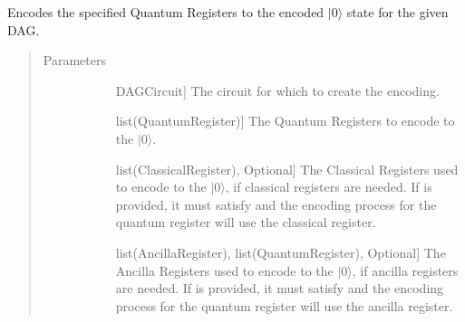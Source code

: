 \documentclass[letterpaper,10pt,english]{sphinxmanual}
\begin{document}
\begin{fulllineitems}
\begin{fulllineitems}
\end{fulllineitems}


\begin{fulllineitems}
\label{\detokenize{Steane:Steane.SteaneEncoder.getEncoderDag}}
\sphinxAtStartPar
Encodes the specified Quantum Registers to the encoded \(|0\rangle\) state for the given DAG.
\begin{quote}\begin{description}
\item[{Parameters}] \leavevmode\begin{description}
\item[{}] \leavevmode{[}DAGCircuit{]}
\sphinxAtStartPar
The circuit for which to create the encoding.

\item[{}] \leavevmode{[}list(QuantumRegister){]}
\sphinxAtStartPar
The Quantum Registers to encode to the \(|0\rangle\).

\item[{}] \leavevmode{[}list(ClassicalRegister), Optional{]}
\sphinxAtStartPar
The Classical Registers used to encode to the \(|0\rangle\), if classical registers are needed. If  is provided, it must satisfy  and the encoding process for the  quantum register will use the  classical register.

\item[{}] \leavevmode{[}list(AncillaRegister), list(QuantumRegister), Optional{]}
\sphinxAtStartPar
The Ancilla Registers used to encode to the \(|0\rangle\), if ancilla registers are needed. If  is provided, it must satisfy  and the encoding process for the  quantum register will use the  ancilla register.

\end{description}

\end{description}\end{quote}

\end{fulllineitems}


\end{fulllineitems}
\end{document}

